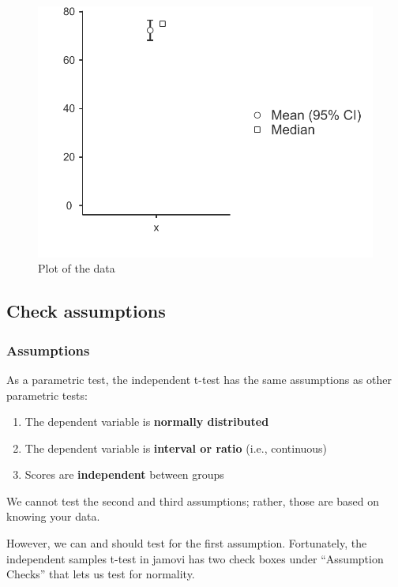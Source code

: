 \documentclass[
]{book}
\begin{document}
\begin{figure}

{\centering \includegraphics[width=0.8\linewidth]{images/07.1-one_sample_t-test/plot} 

}

\caption{Plot of the data}\label{fig:unnamed-chunk-3}
\end{figure}

\hypertarget{check-assumptions}{%
\subsection{Check assumptions}\label{check-assumptions}}

\hypertarget{assumptions}{%
\subsubsection{Assumptions}\label{assumptions}}

As a parametric test, the independent t-test has the same assumptions as other parametric tests:

\begin{enumerate}
\def\labelenumi{\arabic{enumi}.}
\item
  The dependent variable is \textbf{normally distributed}
\item
  The dependent variable is \textbf{interval or ratio} (i.e., continuous)
\item
  Scores are \textbf{independent} between groups
\end{enumerate}

We cannot test the second and third assumptions; rather, those are based on knowing your data.

However, we can and should test for the first assumption. Fortunately, the independent samples t-test in jamovi has two check boxes under ``Assumption Checks'' that lets us test for normality.
\end{document}
